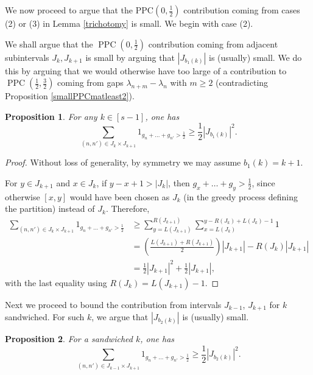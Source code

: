 \documentclass[12pt]{amsart}
\newtheorem{proposition}{Proposition}[section]
\theoremstyle{definition}
\newcommand{\vs}{\vspace{3mm}}
\DeclareMathOperator{\PPC}{PPC}
\begin{document}
\vs

We now proceed to argue that the PPC$(0,\frac{1}{2})$ contribution coming from cases (2) or (3) in Lemma \ref{trichotomy} is small. We begin with case (2).

\vs

We shall argue that the $\PPC(0,\frac{1}{2})$ contribution coming from adjacent subintervals $J_k,J_{k+1}$ is small by arguing that $|J_{b_1(k)}|$ is (usually) small. We do this by arguing that we would otherwise have too large of a contribution to $\PPC(\frac{1}{2},\frac{3}{2})$ coming from gaps $\lambda_{n+m}-\lambda_n$ with $m \ge 2$ (contradicting Proposition \ref{smallPPCmatleast2}). 

\vspace{1.5mm}

\begin{proposition}\label{smallbad1interval}
For any $k \in [s-1]$, one has $$\sum_{(n,n') \in J_k\times J_{k+1}} 1_{g_n+\dots+g_{n'} > \frac{1}{2}} \ge \frac{1}{2}|J_{b_1(k)}|^2.$$ 
\end{proposition}

\begin{proof}
Without loss of generality, by symmetry we may assume $b_1(k) = k+1$.

\vs

For $y \in J_{k+1}$ and $x \in J_k$, if $y-x+1 > |J_k|$, then $g_x+\dots+g_y > \frac{1}{2}$, since otherwise $[x,y]$ would have been chosen as $J_k$ (in the greedy process defining the partition) instead of $J_k$. Therefore, \begin{align*} \sum_{(n,n') \in J_k\times J_{k+1}} 1_{g_n+\dots+g_{n'} > \frac{1}{2}} &\ge \sum_{y=L(J_{k+1})}^{R(J_{k+1})} \sum_{x = L(J_k)}^{y-R(J_k)+L(J_k)-1} 1 \\ &= (\frac{L(J_{k+1})+R(J_{k+1})}{2})|J_{k+1}|-R(J_k)|J_{k+1}| \\ &= \frac{1}{2}|J_{k+1}|^2+\frac{1}{2}|J_{k+1}|, \end{align*} with the last equality using $R(J_k) = L(J_{k+1})-1$. 
\end{proof}

\vspace{1mm}

Next we proceed to bound the contribution from intervals $J_{k-1}$, $J_{k+1}$ for $k$ sandwiched. For such $k$, we argue that $|J_{b_2(k)}|$ is (usually) small.

\vspace{1.5mm}

\begin{proposition}\label{smallbad2interval}
For a sandwiched $k$, one has $$\sum_{(n,n') \in J_{k-1}\times J_{k+1}} 1_{g_n+\dots+g_{n'} > \frac{1}{2}} \ge \frac{1}{2}|J_{b_2(k)}|^2.$$ 
\end{proposition}
\end{document}
